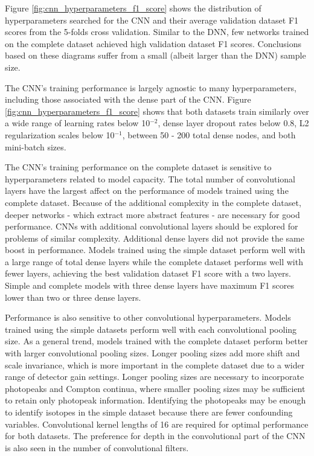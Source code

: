 Figure \ref{fig:cnn_hyperparameters_f1_score} shows the distribution of hyperparameters searched for the CNN and their average validation dataset F1 scores from the 5-folds cross validation. Similar to the DNN, few networks trained on the complete dataset achieved high validation dataset F1 scores. Conclusions based on these diagrams suffer from a small (albeit larger than the DNN) sample size.

The CNN's training performance is largely agnostic to many hyperparameters, including those associated with the dense part of the CNN. Figure \ref{fig:cnn_hyperparameters_f1_score} shows that both datasets train similarly over a wide range of learning rates below 10$^{-2}$, dense layer dropout rates below 0.8, L2 regularization scales below 10$^{-1}$, between 50 - 200 total dense nodes, and both mini-batch sizes.

The CNN's training performance on the complete dataset is sensitive to hyperparameters related to model capacity. The total number of convolutional layers have the largest affect on the performance of models trained using the complete dataset. Because of the additional complexity in the complete dataset, deeper networks - which extract more abstract features - are necessary for good performance. CNNs with additional convolutional layers should be explored for problems of similar complexity. Additional dense layers did not provide the same boost in performance. Models trained using the simple dataset perform well with a large range of total dense layers while the complete dataset performs well with fewer layers, achieving the best validation dataset F1 score with a two layers. Simple and complete models with three dense layers have maximum F1 scores lower than two or three dense layers.

Performance is also sensitive to other convolutional hyperparameters. Models trained using the simple datasets perform well with each convolutional pooling size. As a general trend, models trained with the complete dataset perform better with larger convolutional pooling sizes. Longer pooling sizes add more shift and scale invariance, which is more important in the complete dataset due to a wider range of detector gain settings. Longer pooling sizes are necessary to incorporate photopeaks and Compton continua, where smaller pooling sizes may be sufficient to retain only photopeak information. Identifying the photopeaks may be enough to identify isotopes in the simple dataset because there are fewer confounding variables. Convolutional kernel lengths of 16 are required for optimal performance for both datasets. The preference for depth in the convolutional part of the CNN is also seen in the number of convolutional filters.

